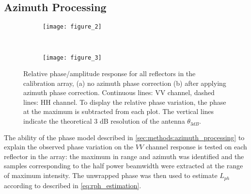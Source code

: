

\subsection{Azimuth Processing}\label{sec:results:azimuth_processing}
\begin{figure*}[ht]
	\centering
	\begin{subfigure}[t]{\textwidth}
		\centering
		\texttt{[image: figure\_2]}
		\label{fig:phase_response_VV:uncorrected}
	\end{subfigure}\\
	\begin{subfigure}[t]{\textwidth}
		\centering
		\texttt{[image: figure\_3]}
		\label{fig:phase_response_VV:corrected}
	\end{subfigure}
	\caption{Relative phase/amplitude response for all reflectors in the calibration array, (a) no azimuth phase correction (b) after applying azimuth phase correction. Continuous lines: VV channel, dashed lines: HH channel. To display the relative phase variation, the phase at the maximum is subtracted from each plot. The vertical lines indicate the theoretical 3 dB resolution of the antenna $\theta_{3dB}$.}
	\label{fig:phase_response_VV}
\end{figure*}
The ability of the phase model described in \autoref{sec:methods:azimuth_processing} to explain the observed phase variation  on the $VV$ channel response is tested on each reflector in the array: the maximum in range and azimuth was identified and the samples corresponding to the half power beamwidth were extracted at the range of maximum intensity. The unwrapped phase was then used to estimate $L_{ph}$ according to described in \autoref{eq:rph_estimation}.

